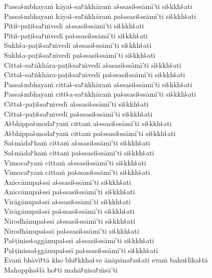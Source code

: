 \documentclass[
  babelLanguage=english,
  final,
  webversion,
]{chantingbook}
\begin{document}
Passa꜕mbhayaṁ kāya꜕-sa꜓ṅkhāraṁ a꜕ssasi꜕ssāmī'ti si꜕kkh꜕ati\\
Passa꜕mbhayaṁ kāya꜕-sa꜓ṅkhāraṁ pa꜕ssasi꜕ssāmī'ti si꜕kkh꜕ati\\
Pīti꜕-paṭi꜕sa꜓ṁvedī a꜕ssasi꜕ssāmī'ti si꜕kkh꜕ati\\
Pīti꜕-paṭi꜕sa꜓ṁvedī pa꜕ssasi꜕ssāmī'ti si꜕kkh꜕ati\\
Sukh꜕a-paṭi꜕sa꜓ṁvedī a꜕ssasi꜕ssāmī'ti si꜕kkh꜕ati\\
Sukh꜕a-paṭi꜕sa꜓ṁvedī pa꜕ssasi꜕ssāmī'ti si꜕kkh꜕ati\\
Citta꜕-sa꜓ṅkhāra-paṭi꜕sa꜓ṁvedī a꜕ssasi꜕ssāmī'ti si꜕kkh꜕ati\\
Citta꜕-sa꜓ṅkhāra-paṭi꜕sa꜓ṁvedī pa꜕ssasi꜕ssāmī'ti si꜕kkh꜕ati\\
Passa꜕mbhayaṁ citta꜕-sa꜓ṅkhāraṁ a꜕ssasi꜕ssāmī'ti si꜕kkh꜕ati\\
Passa꜕mbhayaṁ citt꜕a-sa꜓ṅkhāraṁ pa꜕ssasi꜕ssāmī'ti si꜕kkh꜕ati\\
Citta꜕-paṭi꜕sa꜓ṁvedī a꜕ssasi꜕ssāmī'ti si꜕kkh꜕ati\\
Citta꜕-paṭi꜕sa꜓ṁvedī pa꜕ssasi꜕ssāmī'ti si꜕kkh꜕ati\\
A꜕bhippa꜕moda꜓yaṁ cittaṁ a꜕ssasi꜕ssāmī'ti si꜕kkh꜕ati\\
A꜕bhippa꜕moda꜓yaṁ cittaṁ pa꜕ssasi꜕ssāmī'ti si꜕kkh꜕ati\\
Sa꜕māda꜓haṁ cittaṁ a꜕ssasi꜕ssāmī'ti si꜕kkh꜕ati\\
Sa꜕māda꜓haṁ cittaṁ pa꜕ssasi꜕ssāmī'ti si꜕kkh꜕ati\\
Vimoca꜓yaṁ cittaṁ a꜕ssasi꜕ssāmī'ti si꜕kkh꜕ati\\
Vimoca꜓yaṁ cittaṁ pa꜕ssasi꜕ssāmī'ti si꜕kkh꜕ati\\
Aniccānupa꜕ssī a꜕ssasi꜕ssāmī'ti si꜕kkh꜕ati\\
Aniccānupa꜕ssī pa꜕ssasi꜕ssāmī'ti si꜕kkh꜕ati\\
Virāgānupa꜕ssī a꜕ssasi꜕ssāmī'ti si꜕kkh꜕ati\\
Virāgānupa꜕ssī pa꜕ssasi꜕ssāmī'ti si꜕kkh꜕ati\\
Nirodhānupa꜕ssī a꜕ssasi꜕ssāmī'ti si꜕kkh꜕ati\\
Nirodhānupa꜕ssī pa꜕ssasi꜕ssāmī'ti si꜕kkh꜕ati\\
Pa꜕ṭiniss꜕aggānupa꜕ssī a꜕ssasi꜕ssāmī'ti si꜕kkh꜕ati\\
Pa꜕ṭinissa꜕ggānupa꜕ssī pa꜕ssasi꜕ssāmī'ti si꜕kkh꜕ati\\
Evaṁ bhāvi꜓tā kho bhi꜓kkha꜕ve ānāpāna꜓ss꜕ati evaṁ bahu꜕līka꜕tā\\
Mahappha꜕lā ho꜓ti mahā꜓nisa꜓ṁsā'ti
\end{document}
